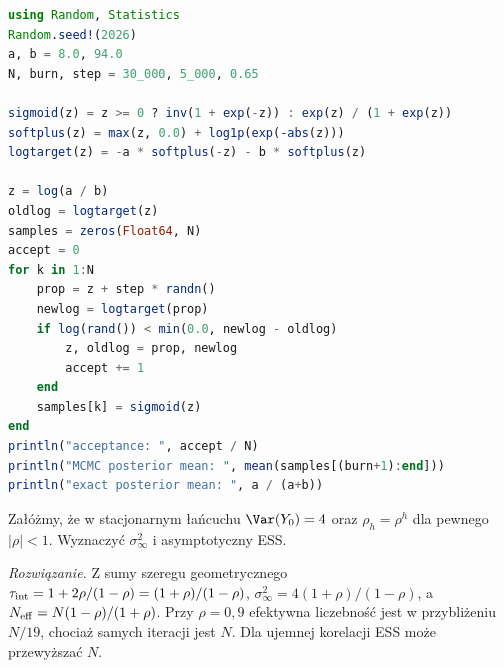 \begin{lstlisting}[language=Julia,caption={Kompletny program: random-walk Metropolis dla posterioru beta we współrzędnej logit (Julia, Random i Statistics).}]
using Random, Statistics
Random.seed!(2026)
a, b = 8.0, 94.0
N, burn, step = 30_000, 5_000, 0.65

sigmoid(z) = z >= 0 ? inv(1 + exp(-z)) : exp(z) / (1 + exp(z))
softplus(z) = max(z, 0.0) + log1p(exp(-abs(z)))
logtarget(z) = -a * softplus(-z) - b * softplus(z)

z = log(a / b)
oldlog = logtarget(z)
samples = zeros(Float64, N)
accept = 0
for k in 1:N
    prop = z + step * randn()
    newlog = logtarget(prop)
    if log(rand()) < min(0.0, newlog - oldlog)
        z, oldlog = prop, newlog
        accept += 1
    end
    samples[k] = sigmoid(z)
end
println("acceptance: ", accept / N)
println("MCMC posterior mean: ", mean(samples[(burn+1):end]))
println("exact posterior mean: ", a / (a+b))
\end{lstlisting}

\begin{zadanie}
Załóżmy, że w stacjonarnym łańcuchu $\Var(Y_0)=4$ oraz
$\rho_h=\rho^h$ dla pewnego $|\rho|<1$.
Wyznaczyć $\sigma_\infty^2$ i asymptotyczny ESS.
\par\emph{Rozwiązanie.} Z sumy szeregu geometrycznego
$\tau_{\rm int}=1+2\rho/(1-\rho)=(1+\rho)/(1-\rho)$,
$\sigma_\infty^2=4(1+\rho)/(1-\rho)$, a
$N_{\rm eff}=N(1-\rho)/(1+\rho)$.
Przy $\rho=0{,}9$ efektywna liczebność jest w przybliżeniu
$N/19$, chociaż samych iteracji jest $N$.
Dla ujemnej korelacji ESS może przewyższać $N$.
\end{zadanie}

